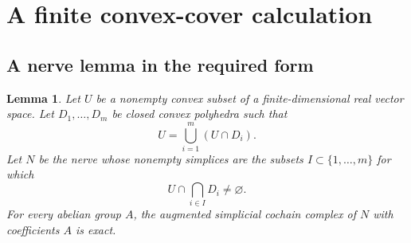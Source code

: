\documentclass[11pt]{article}
\newtheorem{lemma}[theorem]{Lemma}
\theoremstyle{definition}
\theoremstyle{remark}
\begin{document}
\section{A finite convex-cover calculation}

\subsection{A nerve lemma in the required form}


\begin{lemma}\label{lem:convex-nerve}
Let \(U\) be a nonempty convex subset of a finite-dimensional real
vector space. Let \(D_1,\ldots,D_m\) be closed convex polyhedra such
that
\[
U=\bigcup_{i=1}^m(U\cap D_i).
\]
Let \(N\) be the nerve whose nonempty simplices are the subsets
\(I\subset\{1,\ldots,m\}\) for which
\[
U\cap\bigcap_{i\in I}D_i\ne\varnothing.
\]
For every abelian group \(A\), the augmented simplicial cochain
complex of \(N\) with coefficients \(A\) is exact.
\end{lemma}

\end{document}
